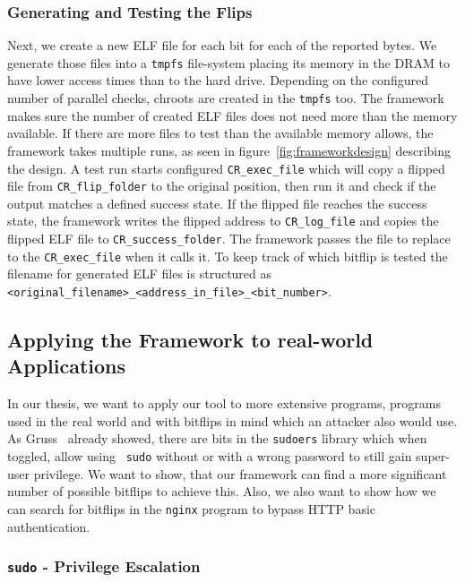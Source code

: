 \subsubsection{Generating and Testing the Flips}

Next, we create a new ELF file for each bit for each of the reported bytes. We
generate those files into a \texttt{tmpfs} file-system placing its memory in the
DRAM to have lower access times than to the hard drive. Depending on the
configured number of parallel checks, chroots are created in the \texttt{tmpfs}
too. The framework makes sure the number of created ELF files does not need more
than the memory available. If there are more files to test than the available
memory allows, the framework takes multiple runs, as seen in
figure~\ref{fig:frameworkdesign} describing the design. A test run starts
configured \texttt{CR\_exec\_file} which will copy a flipped file from
\texttt{CR\_flip\_folder} to the original position, then run it and check if the
output matches a defined success state. If the flipped file reaches the success
state, the framework writes the flipped address to \texttt{CR\_log\_file} and
copies the flipped ELF file to \texttt{CR\_success\_folder}. The framework
passes the file to replace to the \texttt{CR\_exec\_file} when it calls it. To
keep track of which bitflip is tested the filename for generated ELF files is
structured as \texttt{<original\_filename>\_<address\_in\_file>\_<bit\_number>}.

\subsection{Applying the Framework to real-world Applications}

In our thesis, we want to apply our tool to more extensive programs, programs
used in the real world and with bitflips in mind which an attacker also would
use. As Gruss~\etal\cite{flipinthewall} already showed, there are bits in the
\texttt{sudoers} library which when toggled, allow using ~\texttt{sudo} without
or with a wrong password to still gain super-user privilege. We want to show,
that our framework can find a more significant number of possible bitflips to
achieve this. Also, we also want to show how we can search for bitflips in the
\texttt{nginx} program to bypass HTTP basic authentication.

\subsubsection{\texttt{sudo} - Privilege Escalation}

